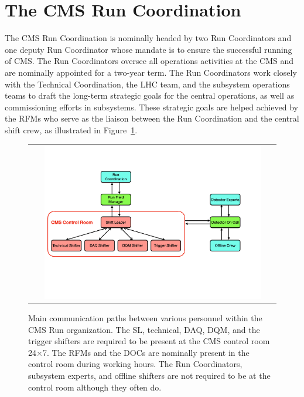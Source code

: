 \section{The CMS Run Coordination}
\label{sec:RC}

The \ac{CMS} Run Coordination is nominally headed by two Run Coordinators and one deputy Run Coordinator whose mandate is to ensure the successful running of \ac{CMS}. The Run Coordinators oversee all operations activities at the \ac{CMS} and are nominally appointed for a two-year term. The Run Coordinators work closely with the Technical Coordination, the \ac{LHC} team, and the subsystem operations teams to draft the long-term strategic goals for the central operations, as well as commissioning efforts in subsystems. These strategic goals are helped achieved by the \acp{RFM} who serve as the liaison between the Run Coordination and the central shift crew, as illustrated in Figure~\ref{fig:RC}.

\begin{figure}[tbh!]
 \begin{center}
 \begin{tabular}{c}
 \includegraphics[width=0.9\textwidth]{figures/Part2/Operation/RC}
 \end{tabular}
 \caption{Main communication paths between various personnel within the \ac{CMS} Run organization. The \ac{SL}, technical, \ac{DAQ}, \ac{DQM}, and the trigger shifters are required to be present at the \ac{CMS} control room 24$\times$7. The \acp{RFM} and the \acp{DOC} are nominally present in the control room during working hours. The Run Coordinators, subsystem experts, and offline shifters are not required to be at the control room although they often do.}
 \label{fig:RC}
 \end{center}
\end{figure}

